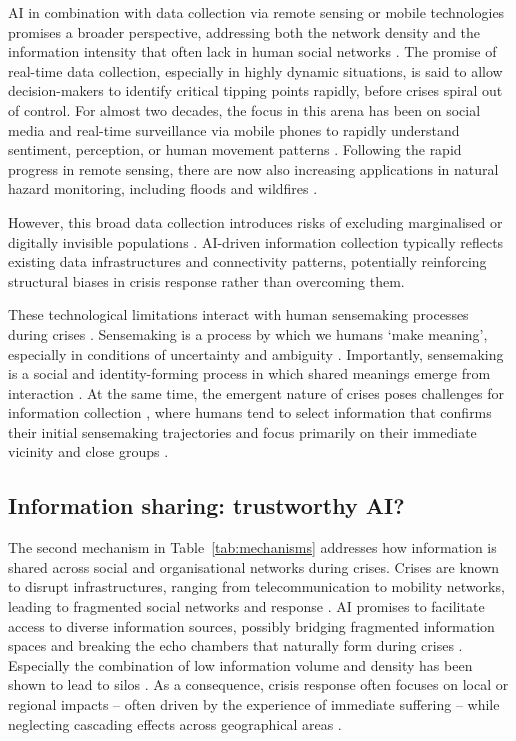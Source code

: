 \documentclass[sn-apacite]{sn-jnl}
\begin{document}
AI in combination with data collection via remote sensing or mobile technologies promises a broader perspective, addressing both the network density and the information intensity that often lack in human social networks \citep{pan2012crisis}. %
The promise of real-time data collection, especially in highly dynamic situations, is said to allow decision-makers to identify critical tipping points rapidly, before crises spiral out of control. For almost two decades, the focus in this arena has been on social media and real-time surveillance via mobile phones to rapidly understand sentiment, perception, or human movement patterns \citep{mai2025evaluating,middleton2013real,qadir2016crisis}. Following the rapid progress in remote sensing, there are now also increasing applications in natural hazard monitoring, including floods \citep{zhou2024threshold} and wildfires \citep{roy2024multi}. %

However, this broad data collection introduces risks of excluding marginalised or digitally invisible populations \citep{coleman2024weaving}. AI-driven information collection typically reflects existing data infrastructures and connectivity patterns, potentially reinforcing structural biases in crisis response rather than overcoming them.

These technological limitations interact with human sensemaking processes during crises \citep{klein2010rapid}. Sensemaking is a process by which we humans `make meaning', especially in conditions of uncertainty and ambiguity \citep{weick2005organizing}. Importantly, sensemaking is a social and identity-forming process in which shared meanings emerge from interaction \citep{maitlis2010sensemaking}. At the same time, the emergent nature of crises poses challenges for information collection \citep{turoff2004design}, where humans tend to select information that confirms their initial sensemaking trajectories \citep{barbera2015tweeting} and focus primarily on their immediate vicinity and close groups \citep{comes2020coordination}.

\subsection{Information sharing: trustworthy AI?}\label{sec:sharing}

The second mechanism in Table~\ref{tab:mechanisms} addresses how information is shared across social and organisational networks during crises. Crises are known to disrupt infrastructures, ranging from telecommunication to mobility networks, leading to fragmented social networks and response \citep{holguin2012unique}. %
AI promises to facilitate access to diverse information sources, possibly bridging fragmented information spaces and breaking the echo chambers that naturally form during crises \citep{jeon2024hearhere}. Especially the combination of low information volume and density has been shown to lead to silos \citep{pan2012crisis}. As a consequence, crisis response often focuses on local or regional impacts -- often driven by the experience of immediate suffering -- while neglecting cascading effects across geographical areas \citep{sigala2022mitigating,wolbers2018introducing}. %
\end{document}
